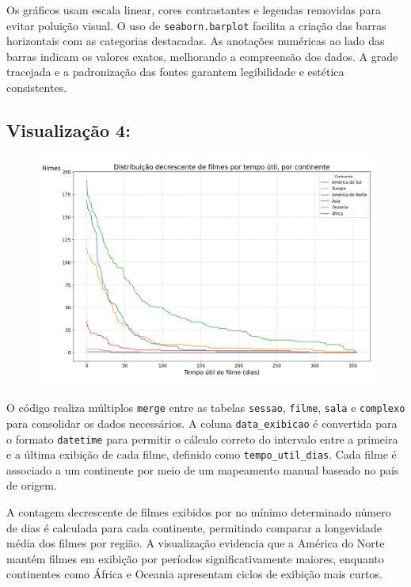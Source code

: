\documentclass{article}
\begin{document}
Os gráficos usam escala linear, cores contrastantes e legendas removidas para evitar poluição visual. O uso de \texttt{seaborn.barplot} facilita a criação das barras horizontais com as categorias destacadas. As anotações numéricas ao lado das barras indicam os valores exatos, melhorando a compreensão dos dados. A grade tracejada e a padronização das fontes garantem legibilidade e estética consistentes.


\subsection*{Visualização 4:}
\begin{figure}[H]
    \centerline{\includegraphics[width = \linewidth]{img/Figure_4.png}}
\end{figure}

O código realiza múltiplos \texttt{merge} entre as tabelas \texttt{sessao}, \texttt{filme}, \texttt{sala} e \texttt{complexo} para consolidar os dados necessários. A coluna \texttt{data\_exibicao} é convertida para o formato \texttt{datetime} para permitir o cálculo correto do intervalo entre a primeira e a última exibição de cada filme, definido como \texttt{tempo\_util\_dias}. Cada filme é associado a um continente por meio de um mapeamento manual baseado no país de origem.

A contagem decrescente de filmes exibidos por no mínimo determinado número de dias é calculada para cada continente, permitindo comparar a longevidade média dos filmes por região. A visualização evidencia que a América do Norte mantém filmes em exibição por períodos significativamente maiores, enquanto continentes como África e Oceania apresentam ciclos de exibição mais curtos.
\end{document}
